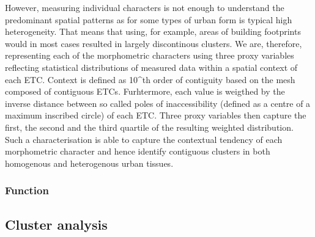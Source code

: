 However, measuring individual characters is not enough to understand the predominant
spatial patterns as for some types of urban form is typical high heterogeneity. That
means that using, for example, areas of building footprints would in most cases resulted
in largely discontinous clusters. We are, therefore, representing each of the
morphometric characters using three proxy variables reflecting statistical distributions
of measured data within a spatial context of each ETC. Context is defined as 10^th
order of contiguity based on the mesh composed of contiguous ETCs. Furhtermore, each
value is weigthed by the inverse distance between so called poles of inaccessibility
(defined as a centre of a maximum inscribed circle) of each ETC. Three proxy variables
then capture the first, the second and the third quartile of the resulting weighted
distribution. Such a characterisation is able to capture the contextual tendency of each
morphometric character and hence identify contiguous clusters in both homogenous and
heterogenous urban tissues.

\subsubsection*{Function}




\subsection*{Cluster analysis}



